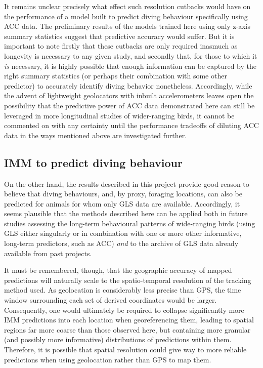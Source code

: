 \documentclass[11pt]{article}
\begin{document}
    It remains unclear precisely what effect such resolution cutbacks would have on the performance of a model built to predict diving behaviour specifically using ACC data. The preliminary results of the models trained here using only z-axis summary statistics suggest that predictive accuracy would suffer. But it is important to note firstly that these cutbacks are only required inasmuch as longevity is necessary to any given study, and secondly that, for those to which it \emph{is} necessary, it is highly possible that enough information can be captured by the right summary statistics (or perhaps their combination with some other predictor) to accurately identify diving behavior nonetheless. Accordingly, while the advent of lightweight geolocators with inbuilt accelerometers leaves open the possibility that the predictive power of ACC data demonstrated here can still be leveraged in more longitudinal studies of wider-ranging birds, it cannot be commented on with any certainty until the performance tradeoffs of diluting ACC data in the ways mentioned above are investigated further.
    
    \subsection{IMM to predict diving behaviour}
    On the other hand, the results described in this project provide good reason to believe that diving behaviours, and, by proxy, foraging locations, can also be predicted for animals for whom only GLS data are available. Accordingly, it seems plausible that the methods described here can be applied both in future studies assessing the long-term behavioural patterns of wide-ranging birds (using GLS either singularly or in combination with one or more other informative, long-term predictors, such as ACC) \emph{and} to the archive of GLS data already available from past projects. 
    
    It must be remembered, though, that the geographic accuracy of mapped predictions will naturally scale to the spatio-temporal resolution of the tracking method used. As geolocation is considerably less precise than GPS, the time window surrounding each set of derived coordinates would be larger. Consequently, one would ultimately be required to collapse significantly more IMM predictions into each location when georeferencing them, leading to spatial regions far more coarse than those observed here, but containing more granular (and possibly more informative) distributions of predictions within them. Therefore, it is possible that spatial resolution could give way to more reliable predictions when using geolocation rather than GPS to map them.
\end{document}
